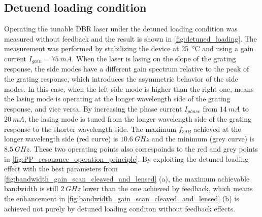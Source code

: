 

\subsection{Detuend loading condition}\label{subsec:detuned_laoding_measurement}
Operating the tunable DBR laser under the detuned loading condition was measured without feedback and the result is shown in \autoref{fig:detuned_loading}. The measurement was performed by stabilizing the device at \SI{25}{\celsius} and using a gain current $I_{gain}=75 \ mA$. When the laser is lasing on the slope of the grating response, the side modes have a different gain spectrum relative to the peak of the grating response, which introduces the asymmetric behavior of the side modes. In this case, when the left side mode is higher than the right one, means the lasing mode is operating at the longer wavelength side of the grating response, and vice versa. By increasing the phase current $I_{phase}$ from $14 \ mA$ to $20 \ mA$, the lasing mode is tuned from the longer wavelength side of the grating response to the shorter wavelength side. The maximum $f_{3dB}$ achieved at the longer wavelength side (red curve) is $10.6 \ GHz$ and the minimum (grey curve) is $8.5 \ GHz$. These two operating points also correspoinds to the red and grey points in \autoref{fig:PP_resonance_operation_principle}. By exploiting the detuned loading effect with the best parameters from \autoref{fig:bandwidth_gain_scan_cleaved_and_lensed} (a), the maximum achievable bandwidth is still $2 \ GHz$ lower than the one achieved by feedback, which means the enhancement in \autoref{fig:bandwidth_gain_scan_cleaved_and_lensed} (b) is achieved not purely by detuned loading conditon without feedback effects.

